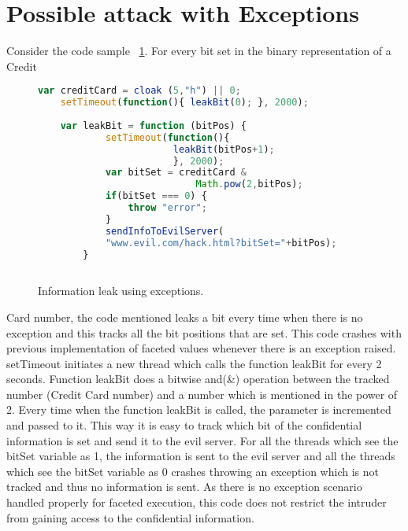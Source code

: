 \section{Possible attack with Exceptions}
Consider the code sample ~\ref{fig:JSInfoLeak}. For every bit set in the binary representation of a Credit 
\begin{figure}
  \centering
\begin{lstlisting}[language=JavaScript] 
	var creditCard = cloak (5,"h") || 0;
	setTimeout(function(){ leakBit(0); }, 2000);
	
	var leakBit = function (bitPos) {
			setTimeout(function(){ 
						leakBit(bitPos+1); 
						}, 2000);
			var bitSet = creditCard & 
							Math.pow(2,bitPos);
			if(bitSet === 0) {
				throw "error";
			}
			sendInfoToEvilServer(
			"www.evil.com/hack.html?bitSet="+bitPos);
		}
			
\end{lstlisting}
    \caption[Information leak using exceptions.]
    {Information leak using exceptions.}
    \label{fig:JSInfoLeak}
\end{figure}
Card number, the code mentioned leaks a bit every time when there is no exception and this tracks all the bit positions that are set. This code crashes with previous implementation of faceted values whenever there is an exception raised. setTimeout initiates a new thread which calls the function leakBit for every 2 seconds. Function leakBit does a \textquotesingle bitwise and\textquotesingle (\&) operation between the tracked number (Credit Card number) and a number which is mentioned in the power of 2. Every time when the function leakBit is called, the parameter is incremented and passed to it. This way it is easy to track which bit of the confidential information is set and send it to the evil server. For all the threads which see the bitSet variable as 1, the information is sent to the evil server and all the threads which see the bitSet variable as 0 crashes throwing an exception which is not tracked and thus no information is sent. As there is no exception scenario handled properly for faceted execution, this code does not restrict the intruder from gaining access to the confidential information.

